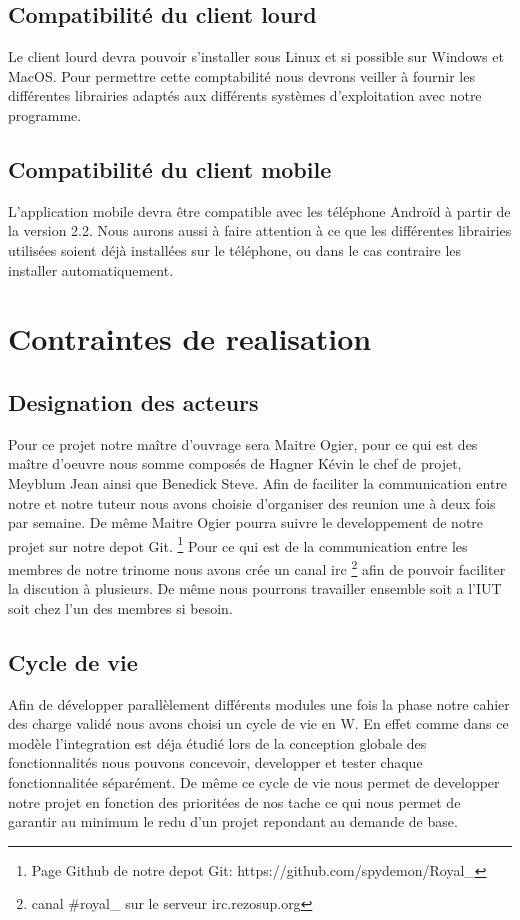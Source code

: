\subsection{Compatibilité du client lourd}
Le client lourd devra pouvoir s'installer sous Linux et si possible sur Windows et MacOS. 
Pour permettre cette comptabilité nous devrons veiller à fournir les différentes librairies adaptés aux différents systèmes d'exploitation avec notre programme. 

\subsection{Compatibilité du client mobile}
L'application mobile devra être compatible avec les téléphone Androïd à partir de la version 2.2. 
Nous aurons aussi à faire attention à ce que les différentes librairies utilisées soient déjà installées sur le téléphone, ou dans le cas contraire les installer automatiquement.

\section{Contraintes de realisation}

\subsection{Designation des acteurs}
Pour ce projet notre maître d'ouvrage sera Maitre Ogier, pour ce qui est des maître d'oeuvre nous somme composés de Hagner Kévin le chef de projet, Meyblum Jean ainsi que Benedick Steve.
Afin de faciliter la communication entre notre et notre tuteur nous avons choisie d'organiser des reunion une à deux fois par semaine. De même Maitre Ogier pourra suivre le developpement de notre projet sur notre depot Git.
\footnote{Page Github de notre depot Git: https://github.com/spydemon/Royal\_} 
Pour ce qui est de la communication entre les membres de notre trinome nous avons crée un canal irc \footnote{ canal \#royal\_ sur le serveur irc.rezosup.org} afin de pouvoir faciliter la discution à plusieurs. 
De même nous pourrons travailler ensemble soit a l'IUT soit chez l'un des membres si besoin.

\subsection{Cycle de vie}
Afin de développer parallèlement différents modules une fois la phase notre cahier des charge validé nous avons choisi un cycle de vie en W. 
En effet comme dans ce modèle l'integration est déja étudié lors de la conception globale des fonctionnalités nous pouvons concevoir, developper et tester chaque fonctionnalitée séparément. 
De même ce cycle de vie nous permet de developper notre projet en fonction des prioritées de nos tache ce qui nous permet de garantir au minimum le redu d'un projet repondant au demande de base.
